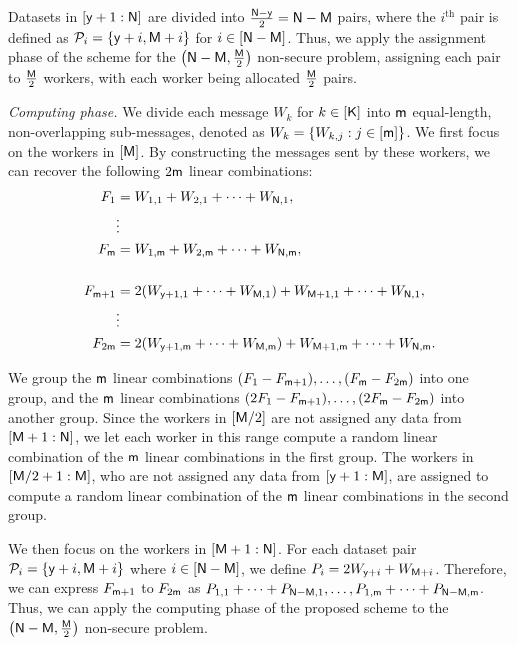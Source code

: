 \documentclass[conference,letterpaper]{IEEEtran}
\begin{document}
Datasets in $[{\sf y}+1 : {\sf N}]$ are divided into $\frac{{\sf N}-{\sf y}}{2} = {\sf N}-{\sf M}$ pairs, where the $i^{\text{th}}$ pair is defined as ${\cal P}_i = \{{\sf y}+i, {\sf M}+i\}$ for $i \in [{\sf N}-{\sf M}]$. Thus, we apply the assignment phase of the scheme for the $\left({\sf N}-{\sf M}, \frac{{\sf M}}{2}\right)$ non-secure problem, assigning each pair to $\frac{{\sf M}}{2}$ workers, with each worker being allocated $\frac{{\sf M}}{2}$ pairs.

{\it Computing phase.}
We divide each message $W_k$ for $k \in [{\sf K}]$ into ${\sf m}$ equal-length, non-overlapping sub-messages, denoted as $W_k = \{W_{k,j} : j \in [{\sf m}]\}$.
We first focus on the workers in $[{\sf M}]$. By constructing the messages sent by these workers, we can recover the following $2{\sf m}$ linear combinations:
\begin{align*}
    F_1 &= W_{1,1} + W_{2,1} + \cdots + W_{{\sf N},1}, \\
    &\vdots \\
    F_{{\sf m}} &= W_{1,{\sf m}} + W_{2,{\sf m}} + \cdots + W_{{\sf N},{\sf m}}, \\
    \\
    F_{{\sf m}+1} &= 2(W_{{\sf y}+1,1} + \cdots + W_{{\sf M},1}) + W_{{\sf M}+1,1} + \cdots + W_{{\sf N},1}, \\
    &\vdots \\
    F_{2{\sf m}} &= 2(W_{{\sf y}+1,{\sf m}} + \cdots + W_{{\sf M},{\sf m}}) + W_{{\sf M}+1,{\sf m}} + \cdots + W_{{\sf N},{\sf m}}.
\end{align*}

We group the ${\sf m}$ linear combinations $(F_1 - F_{{\sf m}+1}), \ldots, (F_{{\sf m}} - F_{2{\sf m}})$ into one group, and the ${\sf m}$ linear combinations $(2F_1 - F_{{\sf m}+1}), \ldots, (2F_{{\sf m}} - F_{2{\sf m}})$ into another group. Since the workers in $[{\sf M}/2]$ are not assigned any data from $[{\sf M}+1: {\sf N}]$, we let each worker in this range compute a random linear combination of the ${\sf m}$ linear combinations in the first group. The workers in $[{\sf M}/2+1: {\sf M}]$, who are not assigned any data from $[{\sf y}+1: {\sf M}]$, are assigned to compute a random linear combination of the ${\sf m}$ linear combinations in the second group.

We then focus on the workers in $[{\sf M}+1: {\sf N}]$. For each dataset pair ${\cal P}_i = \{{\sf y}+i, {\sf M}+i\}$ where $i \in [{\sf N} - {\sf M}]$, we define $P_i = 2W_{{\sf y}+i} + W_{{\sf M}+i}$. Therefore, we can express $F_{{\sf m}+1}$ to $F_{2{\sf m}}$ as $P_{1,1} + \cdots + P_{{\sf N}-{\sf M},1}, \ldots, P_{1,{\sf m}} + \cdots + P_{{\sf N}-{\sf M},{\sf m}}$.
Thus, we can apply the computing phase of the proposed scheme to the $\left({\sf N} - {\sf M}, \frac{{\sf M}}{2}\right)$ non-secure problem.
\end{document}
